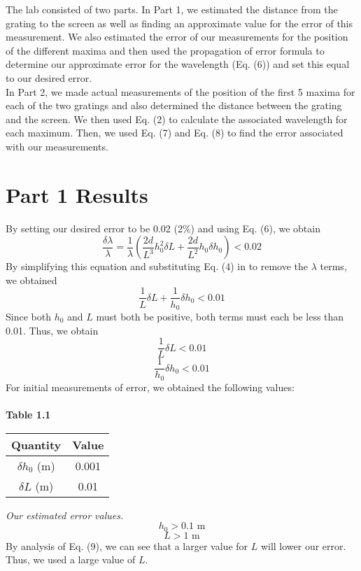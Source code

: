 \documentclass[leqno]{article}
\begin{document}
\noindent The lab consisted of two parts.  In Part 1, we estimated the distance from the grating to the screen as well as finding an approximate value for the error of this measurement.  We also estimated the error of our measurements for the position of the different maxima and then used the propagation of error formula to determine our approximate error for the wavelength (Eq. (6)) and set this equal to our desired error.\\

\noindent In Part 2, we made actual measurements of the position of the first 5 maxima for each of the two gratings and also determined the distance between the grating and the screen.  We then used Eq. (2) to calculate the associated wavelength for each maximum.  Then, we used Eq. (7) and Eq. (8) to find the error associated with our measurements.
\section*{Part 1 Results}
By setting our desired error to be 0.02 (2\%) and using Eq. (6), we obtain
\begin{equation*}
	\frac{\delta \lambda}{\lambda}=\frac{1}{\lambda}(\frac{2d}{L^3}h_0^2  \delta L+\frac{2d}{L^2}h_0  \delta h_0)<0.02
\end{equation*}
By simplifying this equation and substituting Eq. (4) in to remove the $\lambda$ terms, we obtained
\begin{equation*}
	\frac{1}{L} \delta L + \frac{1}{h_0} \delta h_0 < 0.01
\end{equation*}
Since both $h_0$ and $L$ must both be positive, both terms must each be less than 0.01. Thus, we obtain
\begin{equation}
	\frac{1}{L} \delta L < 0.01
\end{equation}
\begin{equation}
	\frac{1}{h_0} \delta h_0 < 0.01
\end{equation}
For initial measurements of error, we obtained the following values:\\\\
\textbf{Table 1.1}
\begin{tabular}{c|c}
	Quantity & Value\\
	\hline
	$\delta h_0$ (m) & 0.001\\
	$\delta L$ (m) & 0.01
\end{tabular}
\textit{\small Our estimated error values.}
\begin{equation*}
	h_0>0.1\text{ m}
\end{equation*}
\begin{equation*}
	L>1\text{ m}
\end{equation*}
By analysis of Eq. (9), we can see that a larger value for $L$ will lower our error.  Thus, we used a large value of $L$.\\
\end{document}
